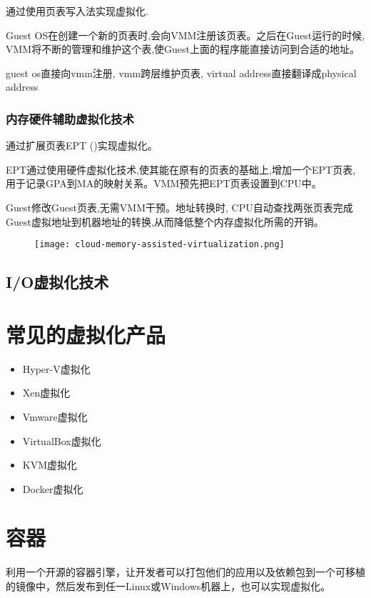 通过使用页表写入法实现虚拟化.

Guest OS在创建一个新的页表时,会向VMM注册该页表。之后在Guest运行的时候, VMM将不断的管理和维护这个表,使Guest上面的程序能直接访问到合适的地址。

guest os直接向vmm注册, vmm跨层维护页表, virtual address直接翻译成physical address

\subsubsection{内存硬件辅助虚拟化技术}

通过扩展页表EPT ()实现虚拟化。

EPT通过使用硬件虚拟化技术,使其能在原有的页表的基础上,增加一个EPT页表,用于记录GPA到MA的映射关系。VMM预先把EPT页表设置到CPU中。

Guest修改Guest页表,无需VMM干预。地址转换时, CPU自动查找两张页表完成Guest虚拟地址到机器地址的转换,从而降低整个内存虚拟化所需的开销。

\begin{figure}[htbp]
    \begin{center}
        \texttt{[image: cloud-memory-assisted-virtualization.png]}
    \end{center}
\end{figure}

\subsection{I/O虚拟化技术}


\section{常见的虚拟化产品}

\begin{itemize}
    \item Hyper-V虚拟化
    \item Xen虚拟化
    \item Vmware虚拟化
    \item VirtualBox虚拟化
    \item KVM虚拟化
    \item Docker虚拟化
\end{itemize}


\section{容器}

\begin{definition}[容器]
    利用一个开源的容器引擎，让开发者可以打包他们的应用以及依赖包到一个可移植的镜像中，然后发布到任一Linux或Windows机器上，也可以实现虚拟化。
\end{definition}

